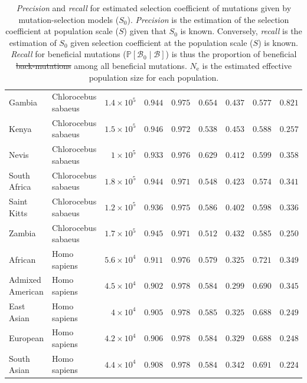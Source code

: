\documentclass{article}
\newcommand{\Ne}{N_{\text{e}}}
\newcommand{\proba}{\mathbb{P}}
\newcommand{\Sphy}{S_{0}}
\newcommand{\SphyBen}{\mathcal{B}_0}
\newcommand{\given}{\mid}
\newcommand{\Spop}{S}
\newcommand{\SpopBen}{\mathcal{B}}
\providecommand{\DIFaddtex}[1]{{\protect\color{blue}\uwave{#1}}} %
\providecommand{\DIFdeltex}[1]{{\protect\color{red}\sout{#1}}}                      %
\providecommand{\DIFaddFL}[1]{\DIFadd{#1}} %
\providecommand{\DIFdelFL}[1]{\DIFdel{#1}} %
\providecommand{\DIFaddbeginFL}{} %
\providecommand{\DIFaddendFL}{} %
\providecommand{\DIFdelbeginFL}{} %
\providecommand{\DIFdelendFL}{} %
\providecommand{\DIFadd}[1]{\texorpdfstring{\DIFaddtex{#1}}{#1}} %
\providecommand{\DIFdel}[1]{\texorpdfstring{\DIFdeltex{#1}}{}} %
\newcommand{\DIFscaledelfig}{0.5}
\newlength{\DIFdelgraphicswidth} %
\newlength{\DIFdelgraphicsheight} %
\newcommand{\DIFaddincludegraphics}[2][]{{\color{blue}\fbox{\DIFOincludegraphics[#1]{#2}}}} %
\newcommand{\DIFdelincludegraphics}[2][]{%
\sbox{\DIFdelgraphicsbox}{\DIFOincludegraphics[#1]{#2}}%
\settoboxwidth{\DIFdelgraphicswidth}{\DIFdelgraphicsbox} %
\settoboxtotalheight{\DIFdelgraphicsheight}{\DIFdelgraphicsbox} %
\scalebox{\DIFscaledelfig}{%
\parbox[b]{\DIFdelgraphicswidth}{\usebox{\DIFdelgraphicsbox}\\[-\baselineskip] \rule{\DIFdelgraphicswidth}{0em}}\llap{\resizebox{\DIFdelgraphicswidth}{\DIFdelgraphicsheight}{%
\setlength{\unitlength}{\DIFdelgraphicswidth}%
\begin{picture}(1,1)%
\thicklines\linethickness{2pt} %
{\color[rgb]{1,0,0}\put(0,0){\framebox(1,1){}}}%
{\color[rgb]{1,0,0}\put(0,0){\line( 1,1){1}}}%
{\color[rgb]{1,0,0}\put(0,1){\line(1,-1){1}}}%
\end{picture}%
}\hspace*{3pt}}} %
} %
\DeclareRobustCommand{\DIFaddbeginFL}{\DIFOaddbeginFL \let\includegraphics\DIFaddincludegraphics} %
\DeclareRobustCommand{\DIFaddendFL}{\DIFOaddendFL \let\includegraphics\DIFOincludegraphics} %
\DeclareRobustCommand{\DIFdelbeginFL}{\DIFOdelbeginFL \let\includegraphics\DIFdelincludegraphics} %
\DeclareRobustCommand{\DIFdelendFL}{\DIFOaddendFL \let\includegraphics\DIFOincludegraphics} %
\begin{document}
\begin{table}[tb]
\begin{adjustbox}{width=\textwidth}
\begin{tabular}{||l|l|r||r|r||r|r||r|r||}
                \rowcolor{LIGHTGREY} Gambia & Chlorocebus sabaeus & $1.4\times 10^{5}$ & $ 0.944$ & $ 0.975$ & $ 0.654$ & $ 0.437$ & $ 0.577$ & $ 0.821$ \\
                \rowcolor{LIGHTGREY} Kenya & Chlorocebus sabaeus & $1.5\times 10^{5}$ & $ 0.946$ & $ 0.972$ & $ 0.538$ & $ 0.453$ & $ 0.588$ & $ 0.257$ \\
                \rowcolor{LIGHTGREY} Nevis & Chlorocebus sabaeus & $ 1\times 10^{5}$ & $ 0.933$ & $ 0.976$ & $ 0.629$ & $ 0.412$ & $ 0.599$ & $ 0.358$ \\
                \rowcolor{LIGHTGREY} South Africa & Chlorocebus sabaeus & $1.8\times 10^{5}$ & $ 0.944$ & $ 0.971$ & $ 0.548$ & $ 0.423$ & $ 0.574$ & $ 0.341$ \\
                \rowcolor{LIGHTGREY} Saint Kitts & Chlorocebus sabaeus & $1.2\times 10^{5}$ & $ 0.936$ & $ 0.975$ & $ 0.586$ & $ 0.402$ & $ 0.598$ & $ 0.336$ \\
                \rowcolor{LIGHTGREY} Zambia & Chlorocebus sabaeus & $1.7\times 10^{5}$ & $ 0.945$ & $ 0.971$ & $ 0.512$ & $ 0.432$ & $ 0.585$ & $ 0.250$ \\
                African & Homo sapiens & $5.6\times 10^{4}$ & $ 0.911$ & $ 0.976$ & $ 0.579$ & $ 0.325$ & $ 0.721$ & $ 0.349$ \\
                Admixed American & Homo sapiens & $4.5\times 10^{4}$ & $ 0.902$ & $ 0.978$ & $ 0.584$ & $ 0.299$ & $ 0.690$ & $ 0.345$ \\
                East Asian & Homo sapiens & $ 4\times 10^{4}$ & $ 0.905$ & $ 0.978$ & $ 0.585$ & $ 0.325$ & $ 0.688$ & $ 0.249$ \\
                European & Homo sapiens & $4.2\times 10^{4}$ & $ 0.906$ & $ 0.978$ & $ 0.584$ & $ 0.329$ & $ 0.688$ & $ 0.248$ \\
                South Asian & Homo sapiens & $4.4\times 10^{4}$ & $ 0.908$ & $ 0.978$ & $ 0.584$ & $ 0.342$ & $ 0.691$ & $ 0.224$ \\
                \bottomrule
            \end{tabular}
        \end{adjustbox}
        \caption{
            \textit{Precision} and \textit{recall} for estimated selection coefficient of mutations given by mutation-selection models ($\Sphy$).
            \textit{Precision} is the estimation of the selection coefficient at population scale ($\Spop$) given that $\Sphy$ is known.
            Conversely, \textit{recall} is the estimation of $\Sphy$ given selection coefficient at the population scale ($\Spop$) is known.
            \textit{Recall} for beneficial mutations ($\proba [\SphyBen \given \SpopBen]$) is thus the proportion of beneficial \DIFdelbeginFL \DIFdelFL{back-mutations }\DIFdelendFL \DIFaddbeginFL \DIFaddFL{non-adaptive mutations }\DIFaddendFL among all beneficial mutations.
            $\Ne$ is the estimated effective population size for each population.
        }
        \label{table:proba}
    \end{table}
\end{document}
